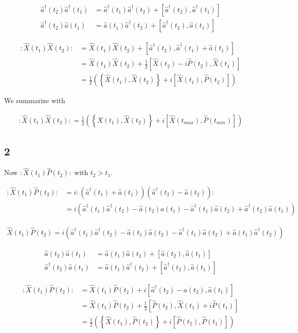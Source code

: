 \documentclass[12pt]{article}
\newcommand{\ahat}{\hat{a}}
\newcommand{\adag}{\ahat^{\dag}}
\begin{document}
\begin{align}
\adag(t_2)\adag(t_1) &= \adag(t_1)\adag(t_2) + \left[\adag(t_2),\adag(t_1)\right]\\
\adag(t_2)\ahat(t_1) &= \ahat(t_1)\adag(t_2) + \left[\adag(t_2),\ahat(t_1)\right]
\end{align}

\begin{align}
:\hat{X}(t_1)\hat{X}(t_2): &= \hat{X}(t_1)\hat{X}(t_2) + \left[\adag(t_2),\adag(t_1) + \ahat(t_1)\right]\\
&= \hat{X}(t_1)\hat{X}(t_2) + \frac{1}{2} \left[\hat{X}(t_2)-i\hat{P}(t_2),\hat{X}(t_1)\right]\\
&= \frac{1}{2}\left(\left\{\hat{X}(t_1),\hat{X}(t_2)\right\} + i \left[\hat{X}(t_1),\hat{P}(t_2)\right]\right)
\end{align}

We summarize with

\begin{align}
:\hat{X}(t_1)\hat{X}(t_2): = \frac{1}{2}\left(\left\{\hat{X}(t_1),\hat{X}(t_2)\right\} + i \left[\hat{X}(t_{max}),\hat{P}(t_{min})\right]\right)
\end{align}


\pagebreak

\subsection{2}

Now $:\hat{X}(t_1)\hat{P}(t_2):$ with $t_2>t_1$.

\begin{align}
:\hat{X}(t_1)\hat{P}(t_2): &= i:(\adag(t_1)+\ahat(t_1))(\adag(t_2)-\ahat(t_2)):\\
&= i(\adag(t_1)\adag(t_2) - \ahat(t_2)\ahat(t_1) - \adag(t_1)\ahat(t_2) + \adag(t_2)\ahat(t_1))
\end{align}

\begin{align}
\hat{X}(t_1)\hat{P}(t_2) = i(\adag(t_1)\adag(t_2) - \ahat(t_1)\ahat(t_2) - \adag(t_1)\ahat(t_2) + \ahat(t_1)\adag(t_2))
\end{align}

\begin{align}
\ahat(t_2)\ahat(t_1) &= \ahat(t_1)\ahat(t_2) + \left[\ahat(t_2),\ahat(t_1)\right]\\
\adag(t_2)\ahat(t_1) &= \ahat(t_1)\adag(t_2) + \left[\adag(t_2),\ahat(t_1)\right]
\end{align}

\begin{align}
:\hat{X}(t_1)\hat{P}(t_2): &= \hat{X}(t_1)\hat{P}(t_2) + i\left[\adag(t_2) - \ahat(t_2), \ahat(t_1)\right]\\
&= \hat{X}(t_1)\hat{P}(t_2) + \frac{1}{2} \left[\hat{P}(t_2), \hat{X}(t_1) + i \hat{P}(t_1)\right]\\
&= \frac{1}{2}\left(\left\{\hat{X}(t_1),\hat{P}(t_2)\right\} + i \left[\hat{P}(t_2),\hat{P}(t_1)\right]\right)
\end{align}
\end{document}

